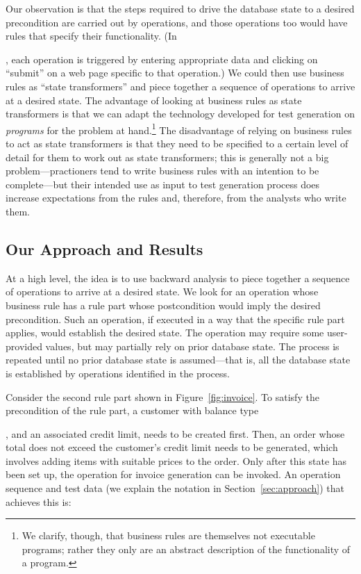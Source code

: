 Our observation is that the steps required to drive the database state to a
desired precondition are carried out by operations, and those operations too
would have rules that specify their functionality.  (In \subject{jbilling}, each
operation is triggered by entering appropriate data and clicking on ``submit''
on a web page specific to that operation.) We could then use business rules as
``state transformers'' and piece together a sequence of operations to arrive at
a desired state.  The advantage of looking at business rules as state
transformers is that we can adapt the technology developed for test generation
on \textit{programs} for the problem at hand.\footnote{We clarify, though, that
  business rules are themselves not executable programs; rather they only are an
  abstract description of the functionality of a program.}  The disadvantage of
relying on business rules to act as state transformers is that they need to be
specified to a certain level of detail for them to work out as state
transformers; this is generally not a big problem---practioners tend to write
business rules with an intention to be complete---but their intended use as
input to test generation process does increase expectations from the rules and,
therefore, from the analysts who write them.

\subsection{Our Approach and Results}

At a high level, the idea is to use backward analysis to piece together a
sequence of operations to arrive at a desired state.  We look for an operation
whose business rule has a rule part whose postcondition would imply the desired
precondition.  Such an operation, if executed in a way that the specific rule
part applies, would establish the desired state.  The operation may require some
user-provided values, but may partially rely on prior database state. The
process is repeated until no prior database state is assumed---that is, all the
database state is established by operations identified in the process.

Consider the second rule part shown in Figure~\ref{fig:invoice}. To satisfy the
precondition of the rule part, a customer with balance type \subject{Credit},
and an associated credit limit, needs to be created first. Then, an order whose
total does not exceed the customer's credit limit needs to be generated, which
involves adding items with suitable prices to the order. Only after this state
has been set up, the operation for invoice generation can be invoked. An
operation sequence and test data (we explain the notation in
Section~\ref{sec:approach}) that achieves this is:

